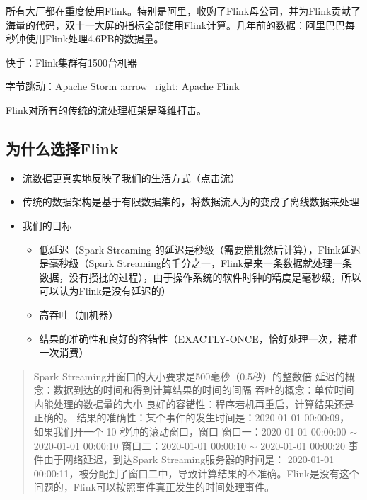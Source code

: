 所有大厂都在重度使用Flink。特别是阿里，收购了Flink母公司，并为Flink贡献了海量的代码，双十一大屏的指标全部使用Flink计算。几年前的数据：阿里巴巴每秒钟使用Flink处理4.6PB的数据量。

快手：Flink集群有1500台机器

字节跳动：Apache Storm :arrow\_right: Apache Flink

Flink对所有的传统的流处理框架是降维打击。

\hypertarget{ux4e3aux4ec0ux4e48ux9009ux62e9flink}{%
\subsection{为什么选择Flink}\label{ux4e3aux4ec0ux4e48ux9009ux62e9flink}}

\begin{itemize}
\tightlist
\item
  流数据更真实地反映了我们的生活方式（点击流）
\item
  传统的数据架构是基于有限数据集的，将数据流人为的变成了离线数据来处理
\item
  我们的目标

  \begin{itemize}
  \tightlist
  \item
    低延迟（Spark Streaming
    的延迟是{秒级}（需要攒批然后计算），Flink延迟是{毫秒级}（Spark
    Streaming的千分之一，Flink是来一条数据就处理一条数据，没有攒批的过程），由于操作系统的软件时钟的精度是毫秒级，所以可以认为Flink是没有延迟的）
  \item
    高吞吐（加机器）
  \item
    结果的准确性和良好的容错性（EXACTLY-ONCE，恰好处理一次，精准一次消费）
  \end{itemize}
\end{itemize}

\begin{quote}
Spark Streaming开窗口的大小要求是500毫秒（0.5秒）的整数倍
延迟的概念：数据到达的时间和得到计算结果的时间的间隔
吞吐的概念：单位时间内能处理的数据量的大小
良好的容错性：程序宕机再重启，计算结果还是正确的。
结果的准确性：某个事件的发生时间是：2020-01-01 00:00:09， 如果我们开一个
10 秒钟的滚动窗口，窗口 窗口一：2020-01-01 00:00:00 \(\sim\) 2020-01-01
00:00:10 窗口二：2020-01-01 00:00:10 \(\sim\) 2020-01-01 00:00:20
事件由于网络延迟，到达Spark Streaming服务器的时间是： 2020-01-01
00:00:11，被分配到了窗口二中，导致计算结果的不准确。Flink是没有这个问题的，{Flink可以按照事件真正发生的时间处理事件}。
\end{quote}

